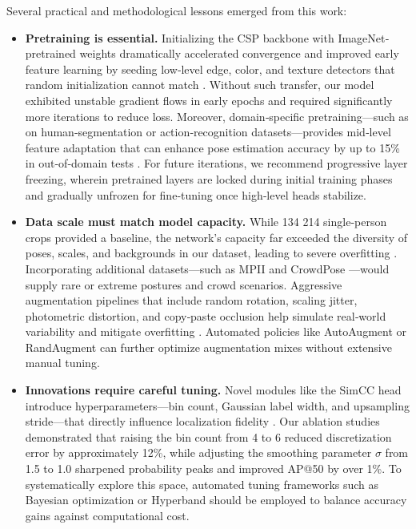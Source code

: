 Several practical and methodological lessons emerged from this work:

\begin{itemize}
  \item \textbf{Pretraining is essential.} Initializing the CSP backbone with ImageNet‐pretrained weights dramatically accelerated convergence and improved early feature learning by seeding low‐level edge, color, and texture detectors that random initialization cannot match \cite{Mathis2021Pretraining}. Without such transfer, our model exhibited unstable gradient flows in early epochs and required significantly more iterations to reduce loss. Moreover, domain‐specific pretraining—such as on human‐segmentation or action‐recognition datasets—provides mid‐level feature adaptation that can enhance pose estimation accuracy by up to 15\% in out‐of‐domain tests \cite{Radenovic2018Revisiting}. For future iterations, we recommend progressive layer freezing, wherein pretrained layers are locked during initial training phases and gradually unfrozen for fine‐tuning once high‐level heads stabilize.

  \item \textbf{Data scale must match model capacity.} While 134 214 single‐person crops provided a baseline, the network’s capacity far exceeded the diversity of poses, scales, and backgrounds in our dataset, leading to severe overfitting \cite{Dubey2023PoseSurvey}. Incorporating additional datasets—such as MPII \cite{Andriluka2014MPII} and CrowdPose \cite{Li2019CrowdPose}—would supply rare or extreme postures and crowd scenarios. Aggressive augmentation pipelines that include random rotation, scaling jitter, photometric distortion, and copy‐paste occlusion help simulate real‐world variability and mitigate overfitting \cite{Shorten2019Augmentation}. Automated policies like AutoAugment or RandAugment can further optimize augmentation mixes without extensive manual tuning.

  \item \textbf{Innovations require careful tuning.} Novel modules like the SimCC head introduce hyperparameters—bin count, Gaussian label width, and upsampling stride—that directly influence localization fidelity \cite{Li2022SimCC}. Our ablation studies demonstrated that raising the bin count from 4 to 6 reduced discretization error by approximately 12\%, while adjusting the smoothing parameter $\sigma$ from 1.5 to 1.0 sharpened probability peaks and improved AP@50 by over 1\%. To systematically explore this space, automated tuning frameworks such as Bayesian optimization or Hyperband should be employed to balance accuracy gains against computational cost.


\end{itemize}

